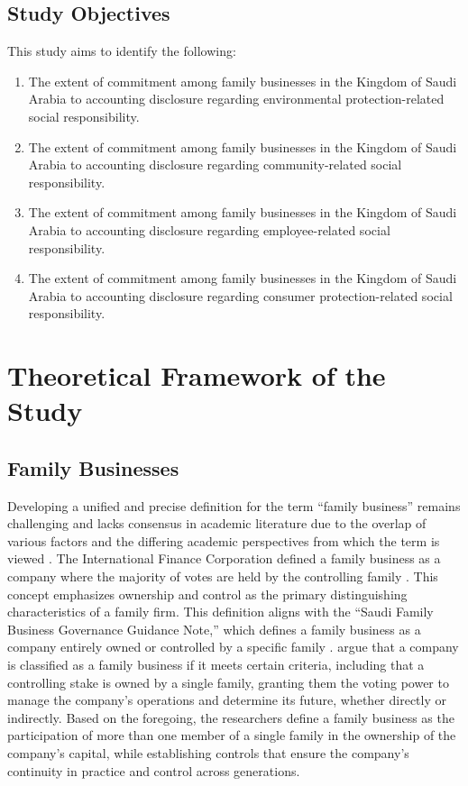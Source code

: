 \documentclass{NSP1}
\begin{document}
\subsection{Study Objectives}
This study aims to identify the following:
\begin{enumerate}
\item[a)] The extent of commitment among family businesses in the Kingdom of Saudi Arabia to accounting disclosure regarding environmental protection-related social responsibility.
\item[b)] The extent of commitment among family businesses in the Kingdom of Saudi Arabia to accounting disclosure regarding community-related social responsibility.
\item[c)] The extent of commitment among family businesses in the Kingdom of Saudi Arabia to accounting disclosure regarding employee-related social responsibility.
\item[d)] The extent of commitment among family businesses in the Kingdom of Saudi Arabia to accounting disclosure regarding consumer protection-related social responsibility.
\end{enumerate}

\section{Theoretical Framework of the Study}
\subsection{Family Businesses}
Developing a unified and precise definition for the term ``family business'' remains challenging and lacks consensus in academic literature due to the overlap of various factors and the differing academic perspectives from which the term is viewed \cite{ref12}. The International Finance Corporation defined a family business as a company where the majority of votes are held by the controlling family \cite{ref38}. This concept emphasizes ownership and control as the primary distinguishing characteristics of a family firm. This definition aligns with the ``Saudi Family Business Governance Guidance Note,'' which defines a family business as a company entirely owned or controlled by a specific family \cite{ref11}. \cite{ref13} argue that a company is classified as a family business if it meets certain criteria, including that a controlling stake is owned by a single family, granting them the voting power to manage the company's operations and determine its future, whether directly or indirectly. Based on the foregoing, the researchers define a family business as the participation of more than one member of a single family in the ownership of the company's capital, while establishing controls that ensure the company's continuity in practice and control across generations.
\end{document}
